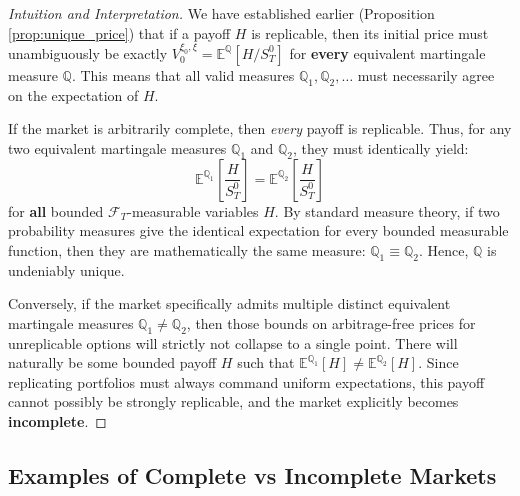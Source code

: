 \begin{proof}[Intuition and Interpretation]
We have established earlier (Proposition \ref{prop:unique_price}) that if a payoff $H$ is replicable, then its initial price must unambiguously be exactly $V_0^{\xi_0, \xi} = \mathbb{E}^{\mathbb{Q}}\left[H / S_T^0\right]$ for \textbf{every} equivalent martingale measure $\mathbb{Q}$. This means that all valid measures $\mathbb{Q}_1, \mathbb{Q}_2, \dots$ must necessarily agree on the expectation of $H$.

If the market is arbitrarily complete, then \textit{every} payoff is replicable. Thus, for any two equivalent martingale measures $\mathbb{Q}_1$ and $\mathbb{Q}_2$, they must identically yield:
$$ \mathbb{E}^{\mathbb{Q}_1}\left[ \frac{H}{S_T^0} \right] = \mathbb{E}^{\mathbb{Q}_2}\left[ \frac{H}{S_T^0} \right] $$
for \textbf{all} bounded $\mathcal{F}_T$-measurable variables $H$. By standard measure theory, if two probability measures give the identical expectation for every bounded measurable function, then they are mathematically the same measure: $\mathbb{Q}_1 \equiv \mathbb{Q}_2$. Hence, $\mathbb{Q}$ is undeniably unique.

Conversely, if the market specifically admits multiple distinct equivalent martingale measures $\mathbb{Q}_1 \neq \mathbb{Q}_2$, then those bounds on arbitrage-free prices for unreplicable options will strictly not collapse to a single point. There will naturally be some bounded payoff $H$ such that $\mathbb{E}^{\mathbb{Q}_1}[H] \neq \mathbb{E}^{\mathbb{Q}_2}[H]$. Since replicating portfolios must always command uniform expectations, this payoff cannot possibly be strongly replicable, and the market explicitly becomes \textbf{incomplete}.
\end{proof}

\subsection{Examples of Complete vs Incomplete Markets}

